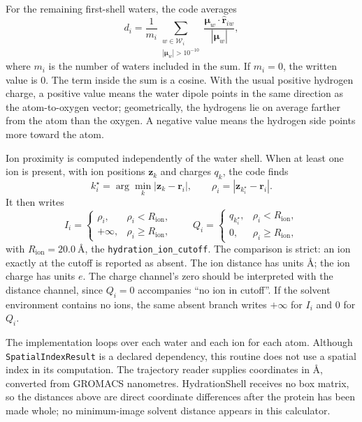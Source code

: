 \documentclass[11pt]{article}
\begin{document}
For the remaining first-shell waters, the code averages
\begin{equation}
  d_i =
  \frac{1}{m_i}
  \sum_{\substack{w\in\mathcal W_i\\ |\bm\mu_w|>10^{-10}}}
  \frac{\bm\mu_w\cdot\hat{\bm r}_{iw}}{|\bm\mu_w|},
  \label{eq:dipole-cos}
\end{equation}
where \(m_i\) is the number of waters included in the sum. If \(m_i=0\), the
written value is \(0\). The term inside the sum is a cosine. With the usual
positive hydrogen charge, a positive value means the water dipole points in the
same direction as the atom-to-oxygen vector; geometrically, the hydrogens lie on
average farther from the atom than the oxygen. A negative value means the
hydrogen side points more toward the atom.

Ion proximity is computed independently of the water shell. When at least one
ion is present, with ion positions \(\bm z_k\) and charges \(q_k\), the code
finds
\begin{equation}
  k_i^\star = \arg\min_k |\bm z_k-\bm r_i|,
  \qquad
  \rho_i = |\bm z_{k_i^\star}-\bm r_i|.
  \label{eq:nearest-ion}
\end{equation}
It then writes
\begin{equation}
  I_i =
  \begin{cases}
    \rho_i, & \rho_i < R_{\mathrm{ion}},\\
    +\infty, & \rho_i \ge R_{\mathrm{ion}},
  \end{cases}
  \qquad
  Q_i =
  \begin{cases}
    q_{k_i^\star}, & \rho_i < R_{\mathrm{ion}},\\
    0, & \rho_i \ge R_{\mathrm{ion}},
  \end{cases}
  \label{eq:ion-output}
\end{equation}
with \(R_{\mathrm{ion}}=\SI{20.0}{\angstrom}\), the
\texttt{hydration\_ion\_cutoff}. The comparison is strict: an ion exactly at the
cutoff is reported as absent. The ion distance has units
\(\si{\angstrom}\); the ion charge has units
\(\si{\elementarycharge}\). The charge channel's zero should be interpreted with
the distance channel, since \(Q_i=0\) accompanies ``no ion in cutoff''.
If the solvent environment contains no ions, the same absent branch writes
\(+\infty\) for \(I_i\) and \(0\) for \(Q_i\).

The implementation loops over each water and each ion for each atom. Although
\texttt{SpatialIndexResult} is a declared dependency, this routine does not use
a spatial index in its computation. The trajectory reader supplies coordinates
in \(\si{\angstrom}\), converted from GROMACS nanometres. HydrationShell receives
no box matrix, so the distances above are direct coordinate differences after
the protein has been made whole; no minimum-image solvent distance appears in
this calculator.
\end{document}
